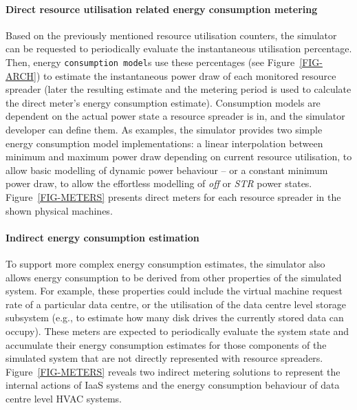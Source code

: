 \documentclass[sort, compress, 5p]{elsarticle}
\begin{document}
\paragraph{Direct resource utilisation related energy consumption metering} Based on the previously mentioned resource utilisation counters, the simulator can be requested to periodically evaluate the instantaneous utilisation percentage. Then, energy \verb+consumption model+s use these percentages (see Figure~\ref{FIG-ARCH}) to estimate the instantaneous power draw of each monitored resource spreader (later the resulting estimate and the metering period is used to calculate the direct meter's energy consumption estimate). Consumption models are dependent on the actual power state a resource spreader is in, and the simulator developer can define them. As examples, the simulator provides two simple energy consumption model implementations:  a linear interpolation between minimum and maximum power draw depending on current resource utilisation, to allow basic modelling of  dynamic power behaviour -- or  a constant minimum power draw, to allow the effortless modelling of \emph{off} or \emph{STR} power states. Figure~\ref{FIG-METERS} presents direct meters for each resource spreader in the shown physical machines.

\paragraph{Indirect energy consumption estimation} To support more complex energy consumption estimates, the simulator also allows energy consumption to be derived from other properties of the simulated system. For example, these properties could include the virtual machine request rate of a particular data centre, or the utilisation of the data centre level storage subsystem (e.g., to estimate how many disk drives the currently stored data can occupy). These meters are expected to periodically evaluate the system state and accumulate their energy consumption estimates for those components of the simulated system that are not directly represented with resource spreaders. Figure~\ref{FIG-METERS} reveals two indirect metering solutions to represent the internal actions of IaaS systems and the energy consumption behaviour of data centre level HVAC systems.
\end{document}

